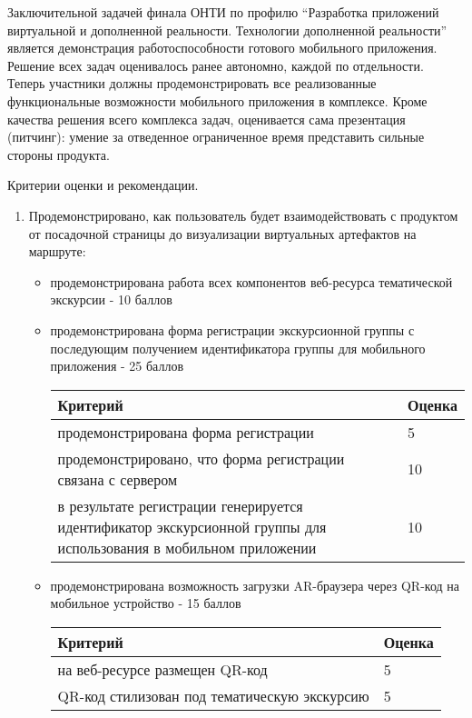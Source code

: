 
Заключительной задачей финала ОНТИ по профилю “Разработка приложений виртуальной и дополненной реальности. Технологии дополненной реальности” является демонстрация работоспособности готового мобильного приложения. Решение всех задач оценивалось ранее автономно, каждой по отдельности. Теперь участники должны продемонстрировать все реализованные функциональные возможности мобильного приложения в комплексе. Кроме качества решения всего комплекса задач, оценивается сама презентация (питчинг): умение за отведенное ограниченное время представить  сильные стороны продукта. 

Критерии оценки и рекомендации.
\begin{enumerate}
    \item Продемонстрировано, как пользователь будет взаимодействовать с продуктом от посадочной страницы до визуализации виртуальных артефактов  на маршруте:
    \begin{itemize}
        \item продемонстрирована работа всех компонентов веб-ресурса тематической экскурсии - 10 баллов
        \item продемонстрирована форма регистрации экскурсионной группы с последующим получением идентификатора группы для мобильного приложения  - 25 баллов
        \begin{tabular}{|p{7cm}|l|}
            \hline
            Критерий & Оценка \\
            \hline
            продемонстрирована форма регистрации & 5 \\
            \hline
            продемонстрировано, что форма регистрации связана с сервером & 10 \\
            \hline
            в результате регистрации генерируется идентификатор экскурсионной группы для использования в мобильном приложении & 10 \\
            \hline
        \end{tabular}
        \item продемонстрирована возможность загрузки AR-браузера через QR-код на мобильное устройство - 15 баллов
        \begin{tabular}{|p{7cm}|l|}
            \hline
            Критерий & Оценка \\
            \hline
            на веб-ресурсе размещен QR-код & 5 \\
            \hline
            QR-код стилизован под тематическую экскурсию & 5 \\

\end{tabular}
\end{itemize}
\end{enumerate}
